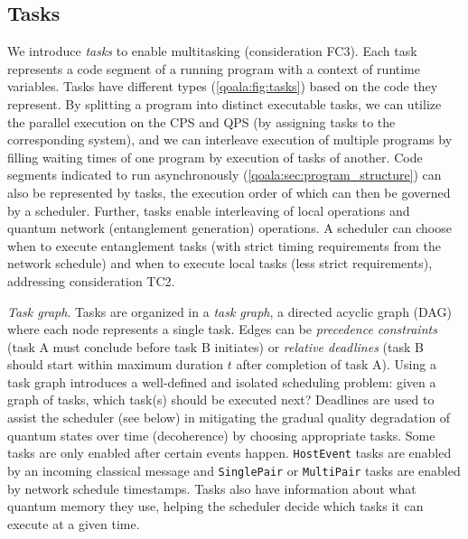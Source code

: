 \subsection{Tasks}
\label{qoala:sec:tasks}
We introduce \textit{tasks} to enable multitasking (consideration FC3).
Each task represents a code segment of a running program with a context of runtime variables.
Tasks have different types (\cref{qoala:fig:tasks}) based on the code they represent.
By splitting a program into distinct executable tasks, 
we can utilize the parallel execution on the CPS and QPS (by assigning tasks to the corresponding system),
and we can interleave execution of multiple programs by filling waiting times of one program by execution of tasks of another.
Code segments indicated to run asynchronously (\cref{qoala:sec:program_structure}) can also be represented by tasks, the execution order of which can then be governed by a scheduler.
Further, tasks enable interleaving of local operations and quantum network (entanglement generation) operations.
A scheduler can choose when to execute entanglement tasks (with strict timing requirements from the network schedule)
and when to execute local tasks (less strict requirements), addressing consideration TC2.

\textit{Task graph}.
Tasks are organized in a \textit{task graph}, a directed acyclic graph (DAG) where each node represents a single task.
Edges can be \textit{precedence constraints} (task A must conclude before task B initiates) or \textit{relative deadlines} (task B should start within maximum duration $t$ after completion of task A).
Using a task graph introduces a well-defined and isolated scheduling problem: given a graph of tasks, which task(s) should be executed next?
Deadlines are used to assist the scheduler (see below) in mitigating the gradual quality degradation of quantum states over time (decoherence) by choosing appropriate tasks.
Some tasks are only enabled after certain events happen.
\texttt{HostEvent} tasks are enabled by an incoming classical message and \texttt{SinglePair} or \texttt{MultiPair} tasks are enabled by network schedule timestamps.
Tasks also have information about what quantum memory they use, helping the scheduler decide which tasks it can execute at a given time.

